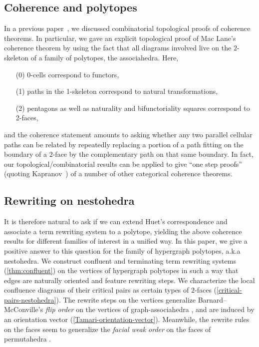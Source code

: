 \subsection*{Coherence and polytopes}

In a previous paper~\cite{CLA1}, we discussed combinatorial topological proofs of coherence theorems.
In particular, we gave an explicit  topological proof of Mac Lane's coherence theorem by using the fact that all diagrams involved live on the $2$-skeleton of a family of polytopes, the associahedra. 
Here, 
\begin{itemize}
\item[(0)] 0-cells correspond to functors, 
\item[(1)] paths in the 1-skeleton correspond to natural transformations,  
\item[(2)]pentagons as well as naturality and bifunctoriality squares correspond to 2-faces,  
\end{itemize}
and the coherence statement amounts to asking whether any two parallel cellular paths can be related by repeatedly replacing a portion of a path fitting on the boundary of a $2$-face by the complementary path on that same boundary.
In fact, our topological/combinatorial results can be applied to give ``one step proofs'' (quoting Kapranov~\cite{kapranov1993}) of a number of other categorical coherence theorems. 

\subsection*{Rewriting on nestohedra}

It is therefore natural to ask if we can extend Huet's correspondence and associate a term rewriting system to a polytope, yielding the above coherence results   for different families of interest in a unified way. 
In this paper, we give a positive answer to this question for the family of hypergraph polytopes, a.k.a nestohedra. 
We construct confluent  and terminating  term rewriting systems (\cref{thm:confluent}) on the vertices of hypergraph polytopes
in such a way that edges are naturally oriented and feature rewriting steps.
We characterize the local confluence diagrams of their critical pairs as certain types of $2$-faces (\cref{critical-pairs-nestohedra}).
The rewrite steps on the vertices generalize Barnard--McConville's \emph{flip order} on the vertices of graph-associahedra \cite{Barnard-McConville}, and are induced by an orientation vector (\cref{Tamari-orientation-vector}).
Meanwhile, the rewrite rules on the faces seem to generalize the \emph{facial weak order} on the faces of permutahedra \cite{KrobLatapyNovelliPhanSchwer,PalaciosRonco,DermenjianHohlwegPilaud}.

